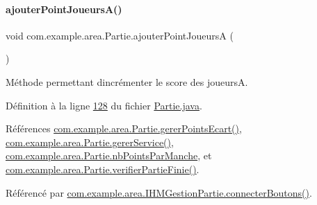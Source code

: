 \paragraph{\texorpdfstring{ajouter\+Point\+Joueurs\+A()}{ajouterPointJoueursA()}}
{\footnotesize\ttfamily void com.\+example.\+area.\+Partie.\+ajouter\+Point\+JoueursA (\begin{DoxyParamCaption}{ }\end{DoxyParamCaption})}



Méthode permettant d\textquotesingle{}incrémenter le score des joueursA. 



Définition à la ligne \hyperlink{_partie_8java_source_l00128}{128} du fichier \hyperlink{_partie_8java_source}{Partie.\+java}.



Références \hyperlink{_partie_8java_source_l00204}{com.\+example.\+area.\+Partie.\+gerer\+Points\+Ecart()}, \hyperlink{_partie_8java_source_l00220}{com.\+example.\+area.\+Partie.\+gerer\+Service()}, \hyperlink{_partie_8java_source_l00035}{com.\+example.\+area.\+Partie.\+nb\+Points\+Par\+Manche}, et \hyperlink{_partie_8java_source_l00192}{com.\+example.\+area.\+Partie.\+verifier\+Partie\+Finie()}.



Référencé par \hyperlink{_i_h_m_gestion_partie_8java_source_l00346}{com.\+example.\+area.\+I\+H\+M\+Gestion\+Partie.\+connecter\+Boutons()}.


